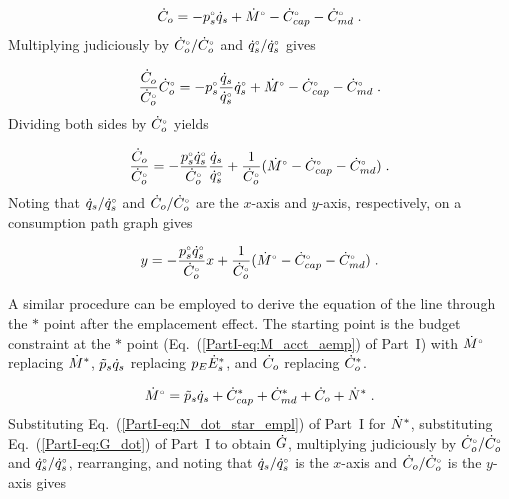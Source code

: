 \begin{equation}
  \rate{C}_o = - \bempl{p}_s \rate{q}_s + \rbempl{M} - \rbempl{C}_{cap} - \rbempl{C}_{\md} \; .
\end{equation}
%
Multiplying judiciously by $\rbempl{C}_o/\rbempl{C}_o$ and $\rbempl{q}_s/\rbempl{q}_s$ gives

\begin{equation}
  \frac{\rate{C}_o}{\rbempl{C}_o} \rbempl{C}_o
       = - \bempl{p}_s \frac{\rate{q}_s}{\rbempl{q}_s} \rbempl{q}_s 
         + \rbempl{M} - \rbempl{C}_{cap} - \rbempl{C}_{\md} \; .
\end{equation}
%
Dividing both sides by $\rbempl{C}_o$ yields

\begin{equation}
  \frac{\rate{C}_o}{\rbempl{C}_o}
       = - \frac{\bempl{p}_s \rbempl{q}_s}{\rbempl{C}_o} \frac{\rate{q}_s}{\rbempl{q}_s}
         + \frac{1}{\rbempl{C}_o} (\rbempl{M} - \rbempl{C}_{cap} - \rbempl{C}_{\md}) \; .
\end{equation}
%
Noting that  
$\rate{q}_s/\rbempl{q}_s$ and 
$\rate{C}_o/\rbempl{C}_o$ are
the $x$-axis and $y$-axis, respectively,
on a consumption path graph gives

\begin{equation} \label{eq:orig_line_prefs}
  y = - \frac{\bempl{p}_s \rbempl{q}_s}{\rbempl{C}_o} x
         + \frac{1}{\rbempl{C}_o} (\rbempl{M} - \rbempl{C}_{cap} - \rbempl{C}_{\md}) \; .
\end{equation}

A similar procedure can be employed to derive the equation of the
\starstar{} line through the $*$ point
after the emplacement effect.
The starting point is the budget constraint at the $*$ point
(Eq.~(\ref{PartI-eq:M_acct_aemp}) of Part~I)
with $\rorig{M}$ replacing $\raempl{M}$, 
$\amacro{p}_s \rate{q}_s$ replacing $p_E \raempl{E}_s$, and
$\rate{C}_o$ replacing $\raempl{C}_o$.

\begin{equation}
  \rbempl{M} = \amacro{p}_s \rate{q}_s + \raempl{C}_{cap} + \raempl{C}_{\md} + \rate{C}_o + \raempl{N} \; .
\end{equation}
%
Substituting Eq.~(\ref{PartI-eq:N_dot_star_empl}) of Part~I for $\raempl{N}$,
substituting Eq.~(\ref{PartI-eq:G_dot}) of Part~I to obtain $\rate{G}$,
multiplying judiciously by $\rbempl{C}_o/\rbempl{C}_o$ and $\rbempl{q}_s/\rbempl{q}_s$, 
rearranging, and noting that 
$\rate{q}_s/\rbempl{q}_s$ is the $x$-axis and 
$\rate{C}_o/\rbempl{C}_o$ is the $y$-axis gives

